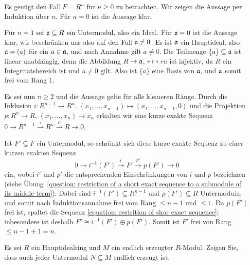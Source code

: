 \begin{solution}
  Es genügt den Fall $F = R^n$ für $n \geq 0$ zu betrachten.
  Wir zeigen die Aussage per Induktion über $n$.
  Für $n = 0$ ist die Aussage klar.
  
  Für $n = 1$ sei $\mathfrak{a} \subseteq R$ ein Untermodul, also ein Ideal.
  Für $\mathfrak{a} = 0$ ist die Aussage klar, wir beschränken uns also auf den Fall $\mathfrak{a} \neq 0$.
  Es ist $\mathfrak{a}$ ein Hauptideal, also $\mathfrak{a} = (a)$ für ein $a \in \mathfrak{a}$, und nach Annahme gilt $a \neq 0$.
  Die Teilmenge $\{a\} \subseteq \mathfrak{a}$ ist linear unabhängig, denn die Abbildung $R \to \mathfrak{a}$, $r \mapsto ra$ ist injektiv, da $R$ ein Integritätsbereich ist und $a \neq 0$ gilt.
  Also ist $\{a\}$ eine Basis von $\mathfrak{a}$, und $\mathfrak{a}$ somit frei vom Rang $1$.
  
  Es sei nun $n \geq 2$ und die Aussage gelte für alle kleineren Ränge.
  Durch die Inklusion $i \colon R^{n-1} \to R^n$, $(x_1, \dotsc, x_{n-1}) \mapsto (x_1, \dotsc, x_{n-1}, 0)$ und die Projektion $p \colon R^n \to R$, $(x_1, \dotsc, x_n) \mapsto x_n$ erhalten wir eine kurze exakte Sequenz $0 \to R^{n-1} \xrightarrow{i} R^n \xrightarrow{p} R \to 0$.
  
  Ist $F' \subseteq F$ ein Untermodul, so schränkt sich diese kurze exakte Sequenz zu einer kurzen exakten Sequenz
  \begin{equation}
    \label{equation: restrition of shor exact sequence}
    0 \to i^{-1}(F') \xrightarrow{i'} F' \xrightarrow{p'} p(F') \to 0
  \end{equation}
  ein, wobei $i'$ und $p'$ die entsprechenden Einschränkungen von $i$ und $p$ bezeichnen (siehe Übung~\ref{question: restriction of a short exact sequence to a submodule of its middle term}).
  Dabei sind $i^{-1}(F') \subseteq R^{n-1}$ und $p(F') \subseteq R$ Untermoduln, und somit nach Induktionsannahme frei vom Rang $\leq n-1$ und $\leq 1$.
  Da $p(F')$ frei ist, spaltet die Sequenz \eqref{equation: restrition of shor exact sequence};
  inbesondere ist deshalb $F' \cong i^{-1}(F') \oplus p(F')$.
  Somit ist $F'$ frei von Rang $\leq n-1 + 1 = n$.
\end{solution}


\begin{question}
  Es sei $R$ ein Hauptidealring und $M$ ein endlich erzeugter $R$-Modul.
  Zeigen Sie, dass auch jeder Untermodul $N \subseteq M$ endlich erzeugt ist.
\end{question}


